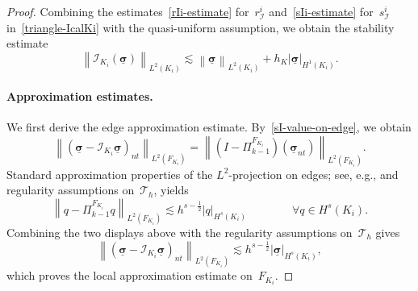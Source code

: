 \documentclass[a4paper,twoside,10pt]{article}
\theoremstyle{plain}
\theoremstyle{remark}
\theoremstyle{definition}
\numberwithin{equation}{section}
\numberwithin{figure}{section}
\newcommand{\Norm}[1]{{\left\|{#1} \right\|}}
\newcommand{\SemiNorm}[1]{{\left|{#1} \right|}}
\newcommand{\Tauh}{\mathcal{T}_h}
\newcommand{\K}{K}
\newcommand{\F}{F}
\newcommand{\sigmabf}{\underline{\boldsymbol{\sigma}}}
\newcommand{\normtang}{{nt}}
\newcommand{\Ltwo}{L^2}
\newcommand{\Ki}{{\K_i}}
\newcommand{\Fi}{{\F_{\Ki}}}
\newcommand{\Id}{I}
\newcommand{\hK}{h_\K}
\newcommand{\IcalKi}{\mathcal{I}_{\Ki}}
\newcommand{\sIi}{s_{\mathcal{I}}^i}
\newcommand{\rIi}{r_{\mathcal{I}}^i}
\newcommand{\PikmoFi}{\Pi_{k-1}^{\Fi}}
\begin{document}
\begin{proof}
Combining the estimates~\eqref{rIi-estimate} for~$\rIi$
and~\eqref{sIi-estimate} for~$\sIi$
in~\eqref{triangle-IcalKi}
with the quasi-uniform assumption,
we obtain the stability estimate
\begin{equation} \label{IcalKi-stability}
\Norm{\IcalKi(\sigmabf)}_{\Ltwo(\Ki)}
\lesssim \Norm{\sigmabf}_{\Ltwo(\Ki)} + \hK\SemiNorm{\sigmabf}_{H^1(\Ki)}.
\end{equation}

\paragraph*{Approximation estimates.}
We first derive the edge approximation estimate.
By~\eqref{sI-value-on-edge},
we obtain
\begin{equation*}
\Norm{(\sigmabf - \IcalKi\sigmabf)_{\normtang}}_{\Ltwo(\Fi)}
=\Norm{(\Id - \PikmoFi)(\sigmabf_{\normtang})}_{\Ltwo(\Fi)}.
\end{equation*}
Standard approximation properties of the $\Ltwo$-projection on edges; see, e.g., \cite[Rem.~18.17]{Ern-Guermond:1}
and regularity assumptions on~$\Tauh$,
yields
\begin{equation*}
\Norm{q - \PikmoFi q}_{\Ltwo(\Fi)} \lesssim h^{s-\frac12}\SemiNorm{q}_{H^s(\Ki)}
\qquad\qquad \forall q \in H^s(\Ki).
\end{equation*}
Combining the two displays above
with the regularity assumptions on~$\Tauh$ gives
\begin{equation*}
\Norm{(\sigmabf - \IcalKi\sigmabf)_{\normtang}}_{\Ltwo(\Fi)}
\lesssim h^{s-\frac12}\SemiNorm{\sigmabf}_{H^s(\Ki)},
\end{equation*}
which proves the local approximation estimate on~$\Fi$.


\end{proof}
\end{document}
